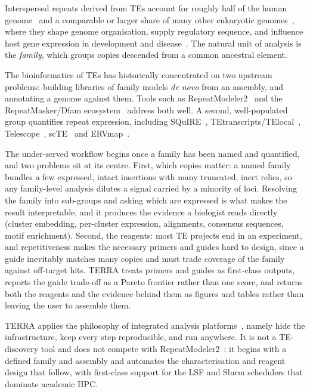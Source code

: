 \documentclass[11pt]{article}
\begin{document}
Interspersed repeats derived from TEs account for roughly half of the human
genome~\citep{lander2001} and a comparable or larger share of many other eukaryotic
genomes~\citep{bourque2018}, where they shape genome organisation, supply regulatory
sequence, and influence host gene expression in development and
disease~\citep{wicker2007,chuong2017enhancers}. The natural unit of analysis is the
\emph{family}, which groups copies descended from a common ancestral element.

The bioinformatics of TEs has historically concentrated on two upstream problems: building
libraries of family models \emph{de novo} from an assembly, and annotating a genome against
them. Tools such as RepeatModeler2~\citep{flynn2020} and the RepeatMasker/Dfam
ecosystem~\citep{hubley2016} address both well. A second, well-populated group quantifies
repeat expression, including SQuIRE~\citep{yang2019squire},
TEtranscripts/TElocal~\citep{jin2015tetranscripts}, Telescope~\citep{bendall2019telescope},
scTE~\citep{he2021scte} and ERVmap~\citep{tokuyama2018ervmap}.

The under-served workflow begins once a family has been named and quantified, and two problems
sit at its centre. First, which copies matter: a named family bundles a few expressed, intact
insertions with many truncated, inert relics, so any family-level analysis dilutes a signal
carried by a minority of loci. Resolving the family into sub-groups and asking which are
expressed is what makes the result interpretable, and it produces the evidence a biologist
reads directly (cluster embedding, per-cluster expression, alignments, consensus sequences,
motif enrichment). Second, the reagents: most TE projects end in an experiment, and
repetitiveness makes the necessary primers and guides hard to design, since a guide inevitably
matches many copies and must trade coverage of the family against off-target hits. TERRA treats
primers and guides as first-class outputs, reports the guide trade-off as a Pareto frontier
rather than one score, and returns both the reagents and the evidence behind them as figures and
tables rather than leaving the user to assemble them.

TERRA applies the philosophy of integrated analysis
platforms~\citep{galaxy2022,genepattern2006,ewels2020,ditommaso2017}, namely hide the
infrastructure, keep every step reproducible, and run anywhere. It is not a TE-discovery tool
and does not compete with RepeatModeler2~\citep{flynn2020}: it begins with a defined family and
assembly and automates the characterisation and reagent design that follow, with first-class
support for the LSF and Slurm schedulers that dominate academic HPC.
\end{document}
